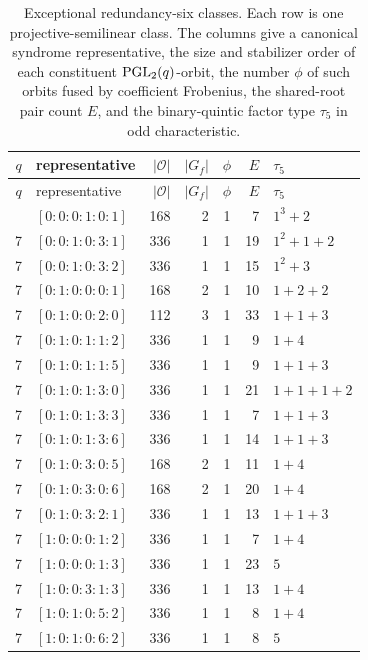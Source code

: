 \begin{longtable}{c l r r c r l}
\caption{Exceptional redundancy-six classes.  Each row is one
projective-semilinear class.  The columns give a canonical syndrome
representative, the size and stabilizer order of each constituent
\(\operatorname{PGL}_2(q)\)-orbit, the number \(\phi\) of such orbits fused by
coefficient Frobenius, the shared-root pair count \(E\), and the binary-quintic
factor type \(\tau_5\) in odd characteristic.}
\label{tab:r6-exceptional}\\
\toprule
\(q\) & representative & \(|\mathcal O|\) & \(|G_f|\) & \(\phi\) & \(E\) & \(\tau_5\)\\
\midrule
\endfirsthead
\toprule
\(q\) & representative & \(|\mathcal O|\) & \(|G_f|\) & \(\phi\) & \(E\) & \(\tau_5\)\\
\midrule
\endhead
\bottomrule
\endfoot
7 & \([0:0:0:1:0:1]\) & 168 & 2 & 1 & 7 & \(1^3+2\)\\
7 & \([0:0:1:0:3:1]\) & 336 & 1 & 1 & 19 & \(1^2+1+2\)\\
7 & \([0:0:1:0:3:2]\) & 336 & 1 & 1 & 15 & \(1^2+3\)\\
7 & \([0:1:0:0:0:1]\) & 168 & 2 & 1 & 10 & \(1+2+2\)\\
7 & \([0:1:0:0:2:0]\) & 112 & 3 & 1 & 33 & \(1+1+3\)\\
7 & \([0:1:0:1:1:2]\) & 336 & 1 & 1 & 9 & \(1+4\)\\
7 & \([0:1:0:1:1:5]\) & 336 & 1 & 1 & 9 & \(1+1+3\)\\
7 & \([0:1:0:1:3:0]\) & 336 & 1 & 1 & 21 & \(1+1+1+2\)\\
7 & \([0:1:0:1:3:3]\) & 336 & 1 & 1 & 7 & \(1+1+3\)\\
7 & \([0:1:0:1:3:6]\) & 336 & 1 & 1 & 14 & \(1+1+3\)\\
7 & \([0:1:0:3:0:5]\) & 168 & 2 & 1 & 11 & \(1+4\)\\
7 & \([0:1:0:3:0:6]\) & 168 & 2 & 1 & 20 & \(1+4\)\\
7 & \([0:1:0:3:2:1]\) & 336 & 1 & 1 & 13 & \(1+1+3\)\\
7 & \([1:0:0:0:1:2]\) & 336 & 1 & 1 & 7 & \(1+4\)\\
7 & \([1:0:0:0:1:3]\) & 336 & 1 & 1 & 23 & \(5\)\\
7 & \([1:0:0:3:1:3]\) & 336 & 1 & 1 & 13 & \(1+4\)\\
7 & \([1:0:1:0:5:2]\) & 336 & 1 & 1 & 8 & \(1+4\)\\
7 & \([1:0:1:0:6:2]\) & 336 & 1 & 1 & 8 & \(5\)\\

\end{longtable}

